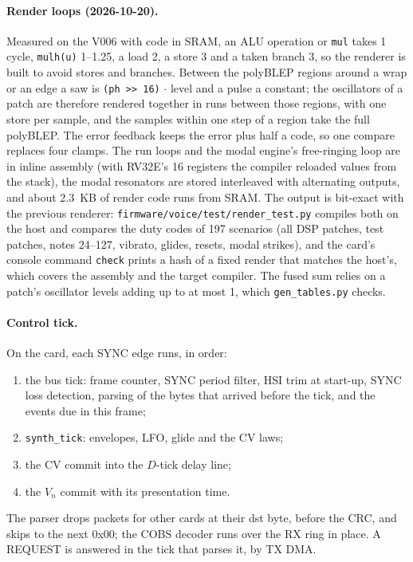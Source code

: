 \documentclass[11pt,a4paper]{article}
\newcommand{\file}[1]{\texttt{#1}}
\begin{document}
\paragraph{Render loops (2026-10-20).} Measured on the V006 with code in SRAM, an ALU operation or \texttt{mul} takes
1 cycle, \texttt{mulh(u)} 1--1.25, a load 2, a store 3 and a taken branch 3, so the renderer is built to avoid stores
and branches. Between the polyBLEP regions around a wrap or an edge a saw is \texttt{(ph >> 16)}$\,\cdot\,$level and a
pulse a constant; the oscillators of a patch are therefore rendered together in runs between those regions, with one
store per sample, and the samples within one step of a region take the full polyBLEP. The error feedback keeps the
error plus half a code, so one compare replaces four clamps. The run loops and the modal engine's free-ringing loop
are in inline assembly (with RV32E's 16 registers the compiler reloaded values from the stack), the modal resonators
are stored interleaved with alternating outputs, and about \SI{2.3}{KB} of render code runs from SRAM. The output is
bit-exact with the previous renderer: \file{firmware/voice/test/render\_test.py} compiles both on the host and
compares the duty codes of 197 scenarios (all DSP patches, test patches, notes 24--127, vibrato, glides, resets, modal
strikes), and the card's console command \texttt{check} prints a hash of a fixed render that matches the host's,
which covers the assembly and the target compiler. The fused sum relies on a patch's oscillator levels adding up to
at most 1, which \file{gen\_tables.py} checks.

\paragraph{Control tick.} On the card, each SYNC edge runs, in order:
\begin{enumerate}
  \item the bus tick: frame counter, SYNC period filter, HSI trim at start-up, SYNC loss detection, parsing of the
    bytes that arrived before the tick, and the events due in this frame;
  \item \texttt{synth\_tick}: envelopes, LFO, glide and the CV laws;
  \item the CV commit into the $D$-tick delay line;
  \item the $V_n$ commit with its presentation time.
\end{enumerate}
The parser drops packets for other cards at their dst byte, before the CRC, and skips to the next 0x00; the COBS
decoder runs over the RX ring in place. A REQUEST is answered in the tick that parses it, by TX DMA.
\end{document}
